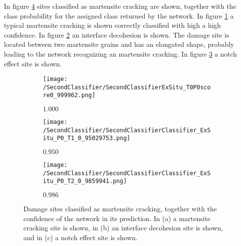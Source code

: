 In figure \ref{fig:ExSituMartensiteSamples} sites classified as martensite cracking are shown, together with the class probability for the assigned class returned by the network. In figure \ref{sub:ExSituMartensiteSamplesM} a typical martensite cracking is shown correctly classified with high a high confidence. In figure \ref{sub:ExSituMartensiteSamplesI} an interface decohesion is shown. The damage site is located between two martensite grains and has an elongated shape, probably leading to the network recognizing an martensite cracking. In figure \ref{sub:ExSituMartensiteSamplesN} a notch effect site is shown. 

\begin{figure}[H]
\centering
\begin{subfigure}{0.3\textwidth}
\texttt{[image: /SecondClassifier/SecondClassifierExSitu\_T0P0score0\_999962.png]}
\caption{$1.000$}
\label{sub:ExSituMartensiteSamplesM}
\end{subfigure}
\begin{subfigure}{0.3\textwidth}
\texttt{[image: /SecondClassifier/SecondClassifierClassifier\_ExSitu\_P0\_T1\_0\_95029753.png]}
\caption{$0.950$}
\label{sub:ExSituMartensiteSamplesI}
\end{subfigure}
\begin{subfigure}{0.3\textwidth}
\texttt{[image: /SecondClassifier/SecondClassifierClassifier\_ExSitu\_P0\_T2\_0\_9859941.png]}
\caption{$0.986$}
\label{sub:ExSituMartensiteSamplesN}
\end{subfigure}
\caption{Damage sites classified as martensite cracking, together with the confidence of the network in its prediction. In (a) a martensite cracking site is shown, in (b) an interface decohesion site is shown, and in (c) a notch effect site is shown.}
\label{fig:ExSituMartensiteSamples}
\end{figure}


